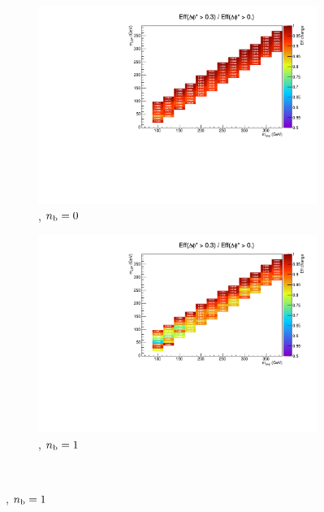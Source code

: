 \begin{figure}[h!]
  \centering
  \begin{subfigure}[b]{0.46\textwidth}
    \includegraphics[width=\textwidth]
    {Figs/sms/t2degen/v19/eff_changes/eff_compare_2d_T2_4body_v19_vs_T2_4body_v20_eq0b_le3j}
    \caption{\njlow, $n_{\text{b}} = 0$}
    \label{fig:t2degen_dphistar_eq0b_le3j}
  \end{subfigure}
  \begin{subfigure}[b]{0.46\textwidth}
    \includegraphics[width=\textwidth]
    {Figs/sms/t2degen/v19/eff_changes/eff_compare_2d_T2_4body_v19_vs_T2_4body_v20_eq1b_le3j}
    \caption{\njlow, $n_{\text{b}} = 1$}
    \label{fig:t2degen_dphistar_eq1b_le3j}
  \end{subfigure}\\
  \vspace{0.2cm}

\end{figure}
